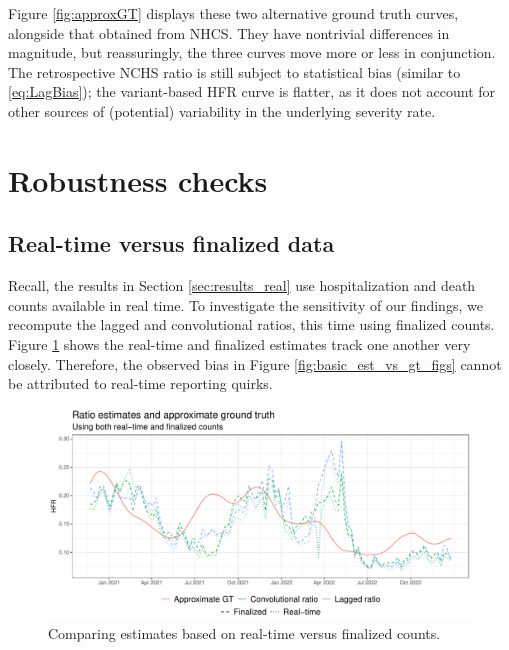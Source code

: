 \documentclass{article}
\begin{document}
Figure \ref{fig:approxGT} displays these two alternative ground truth curves,
alongside that obtained from NHCS. They have nontrivial differences in
magnitude, but reassuringly, the three curves move more or less in
conjunction. The retrospective NCHS ratio is still subject to statistical bias
(similar to \eqref{eq:LagBias}); the variant-based HFR curve is flatter, as it 
does not account for other sources of (potential) variability in the underlying
severity rate.   

\section{Robustness checks}
\label{apx:robustness}

\subsection{Real-time versus finalized data}

Recall, the results in Section \ref{sec:results_real} use hospitalization and
death counts available in real time. To investigate the sensitivity of our
findings, we recompute the lagged and convolutional ratios, this time using
finalized counts. Figure \ref{fig:rt_and_final} shows the real-time and
finalized estimates track one another very closely. Therefore, the observed bias
in Figure \ref{fig:basic_est_vs_gt_figs} cannot be attributed to real-time
reporting quirks.  


\begin{figure}[htb]
\includegraphics[width=\linewidth]{Figures/Real/US_ests_realtime_both.pdf}
\caption{Comparing estimates based on real-time versus finalized counts.}    
\label{fig:rt_and_final}
\end{figure}
\end{document}
